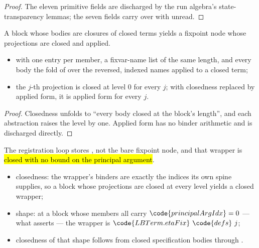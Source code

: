 \begin{proof}
\leanok
{}
 The eleven primitive fields are discharged by the run algebra's state-transparency lemmas;
the seven  fields carry over with  unread.
\end{proof}
\begin{lemma}
\label{lem:rec_block_closed}
\leanok
{}
 A block whose bodies are closures of closed terms yields a fixpoint node whose
projections are closed and applied.
\begin{itemize}
\item {}  with one entry per member, a fixvar-name list of the same length, and
every body the fold of  over the reversed, indexed names applied to a closed term;
\item {} the $j$-th projection is closed at level $0$ for every $j$; with closedness replaced
by applied form, it is applied form for every $j$.
\end{itemize}
\end{lemma}
\begin{proof}
\leanok
{}
 Closedness unfolds to ``every body closed at the block's length'', and each abstraction
raises the level by one. Applied form has no binder arithmetic and is discharged directly.
\end{proof}
\begin{lemma}
\label{lem:lbClosed_etaExpandFix}
\leanok
{}
 The registration loop stores , not the bare fixpoint
node, and that wrapper is \hl{closed with no bound on the principal argument}.
\begin{itemize}
\item closedness: the wrapper's binders are exactly the indices its own spine supplies, so a block
whose projections are closed at every level yields a closed wrapper;
\item shape: at a block whose members all carry $\code{principalArgIdx} = 0$ --- what
 asserts --- the wrapper is $\code{LBTerm.etaFix}\ \code{defs}\ j$;
\item closedness of that shape follows from closed specification bodies through
.
\end{itemize}
\end{lemma}
